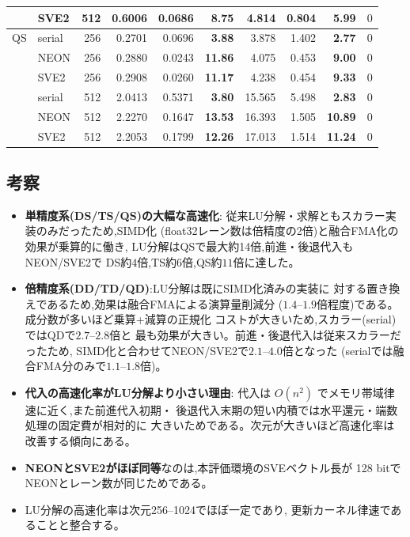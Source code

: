 \documentclass[a4j,dvipdfmx,11pt]{jsarticle}
\begin{document}
\begin{table}[p]
\begin{tabular}{llrrrrrrrl}
 & SVE2 & 512 & 0.6006 & 0.0686 & \textbf{8.75} & 4.814 & 0.804 & \textbf{5.99} & $0$ \\
\midrule
QS & serial & 256 & 0.2701 & 0.0696 & \textbf{3.88} & 3.878 & 1.402 & \textbf{2.77} & $0$ \\
 & NEON & 256 & 0.2880 & 0.0243 & \textbf{11.86} & 4.075 & 0.453 & \textbf{9.00} & $0$ \\
 & SVE2 & 256 & 0.2908 & 0.0260 & \textbf{11.17} & 4.238 & 0.454 & \textbf{9.33} & $0$ \\
 & serial & 512 & 2.0413 & 0.5371 & \textbf{3.80} & 15.565 & 5.498 & \textbf{2.83} & $0$ \\
 & NEON & 512 & 2.2270 & 0.1647 & \textbf{13.53} & 16.393 & 1.505 & \textbf{10.89} & $0$ \\
 & SVE2 & 512 & 2.2053 & 0.1799 & \textbf{12.26} & 17.013 & 1.514 & \textbf{11.24} & $0$ \\
\bottomrule
\end{tabular}
\end{table}

\subsection{考察}

\begin{itemize}
  \item \textbf{単精度系(DS/TS/QS)の大幅な高速化}:
        従来LU分解・求解ともスカラー実装のみだったため,SIMD化
        (float32レーン数は倍精度の2倍)と融合FMA化の効果が乗算的に働き,
        LU分解はQSで最大約14倍,前進・後退代入もNEON/SVE2で
        DS約$4$倍,TS約$6$倍,QS約$11$倍に達した。
  \item \textbf{倍精度系(DD/TD/QD)}:LU分解は既にSIMD化済みの実装に
        対する置き換えであるため,効果は融合FMAによる演算量削減分
        ($1.4$--$1.9$倍程度)である。成分数が多いほど乗算+減算の正規化
        コストが大きいため,スカラー(serial)ではQDで$2.7$--$2.8$倍と
        最も効果が大きい。前進・後退代入は従来スカラーだったため,
        SIMD化と合わせてNEON/SVE2で$2.1$--$4.0$倍となった
        (serialでは融合FMA分のみで$1.1$--$1.8$倍)。
  \item \textbf{代入の高速化率がLU分解より小さい理由}:
        代入は $O(n^2)$ でメモリ帯域律速に近く,また前進代入初期・
        後退代入末期の短い内積では水平還元・端数処理の固定費が相対的に
        大きいためである。次元が大きいほど高速化率は改善する傾向にある。
  \item \textbf{NEONとSVE2がほぼ同等}なのは,本評価環境のSVEベクトル長が
        128 bitでNEONとレーン数が同じためである。
  \item LU分解の高速化率は次元256--1024でほぼ一定であり,
        更新カーネル律速であることと整合する。
\end{itemize}
\end{document}
